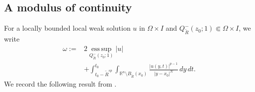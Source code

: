 \documentclass[10pt]{amsart}
\theoremstyle{plain}
\theoremstyle{definition}
\theoremstyle{remark}
\numberwithin{equation}{section}
\newcommand{\R}{\mathbb R}
\begin{document}

\subsection{A modulus of continuity}

For a locally bounded local weak solution $u$ in $\Omega\times I$ and
$Q^-_{\widetilde R}(z_0;1)\Subset\Omega\times I$, we write
\begin{equation}\label{eq:liao-omega}
\begin{split}
\omega
:={}&
2\operatorname*{ess\,sup}_{Q^-_{\widetilde R}(z_0;1)}|u|
\\
&+
\int_{t_0-\widetilde R^{sp}}^{t_0}
\int_{\R^n\setminus B_{\widetilde R}(x_0)}
\frac{|u(y,t)|^{p-1}}{|y-x_0|^{N}}\,dy\,dt.
\end{split}
\end{equation}
We record the following result from \cite[Theorem~1.1]{LiaoModulus}.
\end{document}
